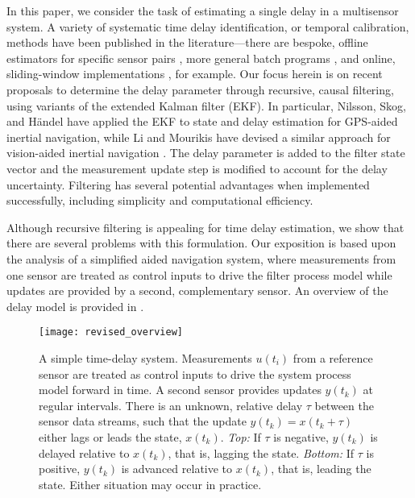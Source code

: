 \documentclass[letterpaper,10pt,conference]{ieeeconf}
\theoremstyle{definition}
\begin{document}
In this paper, we consider the task of estimating a single delay in a multisensor system.
%
A variety of systematic time delay identification, or temporal calibration, methods have been published in the literature---there are bespoke, offline estimators for specific sensor pairs \cite{2011_Mair_Spatio-Temporal,2014_Kelly_General,2014_Kelly_Determining}, more general batch programs \cite{2013_Furgale_Unified,2016_Rehder_General}, and online, sliding-window implementations \cite{2018_Qin_Online}, for example.
%
Our focus herein is on recent proposals to determine the delay parameter through recursive, causal filtering, using variants of the extended Kalman filter (EKF).
%
In particular, Nilsson, Skog, and H\"{a}ndel \cite{2010_Nilsson_Joint,2011_Skog_Time} have applied the EKF to state and delay estimation for GPS-aided inertial navigation, while Li and Mourikis have devised a similar approach for vision-aided inertial navigation \cite{2013_Li_3-D,2014_Li_Online}.
%
The delay parameter is added to the filter state vector and the measurement update step is modified to account for the delay uncertainty.
%
Filtering has several potential advantages when implemented successfully, including simplicity and computational efficiency. 

Although recursive filtering is appealing for time delay estimation, we show that there are several problems with this formulation.
%
Our exposition is based upon the analysis of a simplified aided navigation system, where measurements from one sensor are treated as control inputs to drive the filter process model while updates are provided by a second, complementary sensor.
%
An overview of the delay model is provided in .

\begin{figure}[t]
\vspace{1mm}
\centering
\texttt{[image: revised\_overview]}
\caption{A simple time-delay system.
%
Measurements $u(t_{i})$ from a reference sensor are treated as control inputs to drive the system process model forward in time.
%
A second sensor provides updates $y(t_{k})$ at regular intervals.
%
There is an unknown, relative delay $\tau$ between the sensor data streams, such that the update $y(t_{k}) = x(t_{k} + \tau)$ either lags or leads the state, $x(t_{k})$.
%
\emph{Top:} If $\tau$ is negative, $y(t_{k})$ is delayed relative to $x(t_{k})$, that is, lagging the state.
%
\emph{Bottom:} If $\tau$ is positive, $y(t_{k})$ is advanced relative to $x(t_{k})$, that is, leading the state.
%
Either situation may occur in practice.}
\label{fig:overview}
\vspace{-3mm}
\end{figure}
\end{document}
